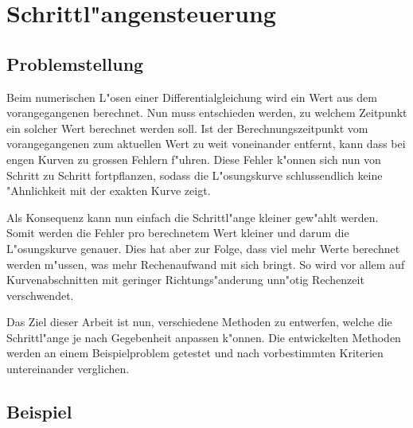 \chapter{Schrittl"angensteuerung\label{chapter:thema}}
\begin{refsection}
\printbibliography[heading=subbibliography]

\section{Problemstellung}

Beim numerischen L"osen einer Differentialgleichung wird ein Wert aus dem vorangegangenen berechnet.
Nun muss entschieden werden, zu welchem Zeitpunkt ein solcher Wert berechnet werden soll.
Ist der Berechnungszeitpunkt vom vorangegangenen zum aktuellen Wert zu weit voneinander entfernt, kann dass bei engen Kurven zu grossen Fehlern f"uhren.
Diese Fehler k"onnen sich nun von Schritt zu Schritt fortpflanzen, sodass die L"osungskurve schlussendlich keine "Ahnlichkeit mit der exakten Kurve zeigt.

Als Konsequenz kann nun einfach die Schrittl"ange kleiner gew"ahlt werden.
Somit werden die Fehler pro berechnetem Wert kleiner und darum die L"osungskurve genauer.
Dies hat aber zur Folge, dass viel mehr Werte berechnet werden m"ussen, was mehr Rechenaufwand mit sich bringt.
So wird vor allem auf Kurvenabschnitten mit geringer Richtungs"anderung unn"otig Rechenzeit verschwendet.

Das Ziel dieser Arbeit ist nun, verschiedene Methoden zu entwerfen, welche die Schrittl"ange je nach Gegebenheit anpassen k"onnen. 
Die entwickelten Methoden werden an einem Beispielproblem getestet und nach vorbestimmten Kriterien untereinander verglichen.

\section{Beispiel}


\end{refsection}
